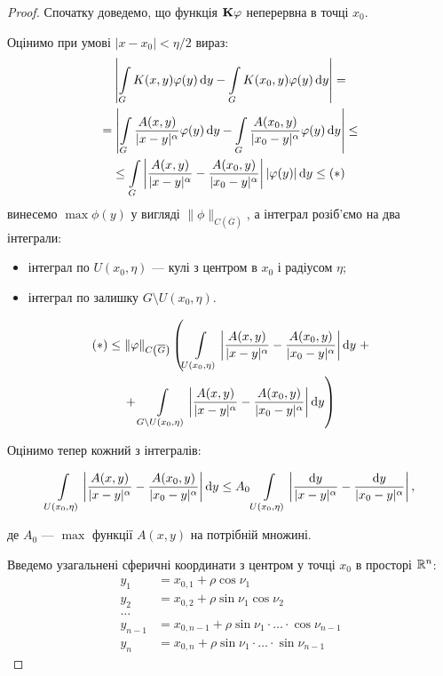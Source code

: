 \begin{proof}
	Спочатку доведемо, що функція $\bf{K}\phi$ неперервна в точці $x_0$. \medskip

	Оцінимо при умові $|x - x_0| < \eta / 2$ вираз:
	\begin{multline}
		\left| \Int_G K(x, y) \phi(y) \diff y - \Int_G K(x_0, y) \phi(y) \diff y \right| = \\
		= \left| \Int_G \dfrac{A(x, y)}{|x - y|^\alpha} \phi(y) \diff y - \Int_G \dfrac{A(x_0, y)}{|x_0 - y|^\alpha} \phi(y) \diff y \right| \le \\
		\le \Int_G \left|\dfrac{A(x, y)}{|x - y|^\alpha} - \dfrac{A(x_0, y)}{|x_0 - y|^\alpha}\right| |\phi(y)| \diff y \le (*)
	\end{multline}
	винесемо $\max \phi(y)$ у вигляді $\|\phi\|_{C\left(\overline G\right)}$, а інтеграл розіб'ємо на два інтеграли: 
	\begin{itemize}
		\item інтеграл по $U(x_0, \eta)$ --- кулі з центром в $x_0$ і радіусом $\eta$; 
		\item інтеграл по залишку $G \setminus U(x_0, \eta)$.
	\end{itemize}

	\begin{multline} 
		(*) \le \|\phi\|_{C\left(\overline G\right)} \left( \Int_{U(x_0, \eta)} \left|\dfrac{A(x, y)}{|x - y|^\alpha} - \dfrac{A(x_0, y)}{|x_0 - y|^\alpha}\right| \diff y\right. + \\
		+ \left.\Int_{G \setminus U(x_0, \eta)} \left|\dfrac{A(x, y)}{|x - y|^\alpha} - \dfrac{A(x_0, y)}{|x_0 - y|^\alpha}\right| \diff y\right)
	\end{multline}
	
	Оцінимо тепер кожний з інтегралів:
	
	\[ \Int_{U(x_0, \eta)} \left|\dfrac{A(x, y)}{|x - y|^\alpha} - \dfrac{A(x_0, y)}{|x_0 - y|^\alpha}\right| \diff y \le A_0 \Int_{U(x_0, \eta)} \left|\dfrac{\diff y}{|x - y|^\alpha} - \dfrac{\diff y}{|x_0 - y|^\alpha}\right|, \]

	де $A_0$ --- $\max$ функції $A(x, y)$ на потрібній множині. \medskip

	Введемо узагальнені сферичні координати з центром у точці $x_0$ в просторі $\RR^n$:
	\begin{equation}
		\begin{aligned} 
			y_1 &= x_{0, 1} + \rho \cos \nu_1 \\
			y_2 &= x_{0, 2} + \rho \sin \nu_1 \cos \nu_2 \\
			\ldots \\
			y_{n - 1} &= x_{0, n - 1} + \rho \sin \nu_1 \cdot \ldots \cdot \cos \nu_{n - 1} \\
			y_n &= x_{0, n} + \rho \sin \nu_1 \cdot \ldots \cdot \sin \nu_{n - 1}
		\end{aligned}
	\end{equation}


\end{proof}

